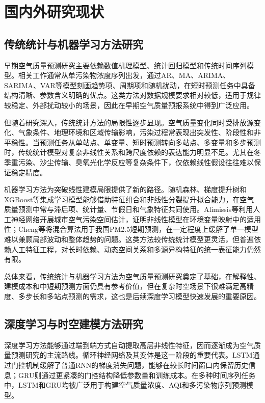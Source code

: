 \section{国内外研究现状}

\subsection{传统统计与机器学习方法研究}

早期空气质量预测研究主要依赖数值机理模型、统计回归模型和传统时间序列模型。相关工作通常从单污染物浓度序列出发，通过AR、MA、ARIMA、SARIMA、VAR等模型刻画趋势项、周期项和随机扰动，在短时预测任务中具备结构清晰、参数含义明确的优点\cite{baklanov_integrated_2007,peinado_statistical_2025}。这类方法对数据规模要求相对较低，适用于规律较稳定、外部扰动较小的场景，因此在早期空气质量预报系统中得到广泛应用。

但随着研究深入，传统统计方法的局限性逐步显现。空气质量变化同时受排放源变化、气象条件、地理环境和区域传输影响，污染过程常表现出突发性、阶段性和非平稳性。当预测任务从单站点、单变量、短时预测转向多站点、多变量和多步预测时，传统统计模型对复杂非线性关系和跨尺度依赖的表达能力明显不足\cite{agbehadji_systematic_2024,peinado_statistical_2025}。尤其在冬季重污染、沙尘传输、臭氧光化学反应等复杂条件下，仅依赖线性假设往往难以保证稳定精度。

机器学习方法为突破线性建模局限提供了新的路径。随机森林、梯度提升树和XGBoost等集成学习模型能够借助特征组合和非线性分裂提升拟合能力\cite{breiman_random_2001,chen_xgboost_2016}，在空气质量预测中常与滞后项、统计量、节假日和气象特征共同使用。Alimissis等利用人工神经网络开展城市空气污染空间估计，证明非线性模型在环境变量映射中的适用性\cite{alimissis_spatial_2018}；Cheng等将混合算法用于我国PM2.5短期预测，在一定程度上缓解了单一模型难以兼顾局部波动和整体趋势的问题\cite{cheng_hybrid_2019}。这类方法较传统统计模型更灵活，但普遍依赖人工特征工程，对长时依赖、动态空间关系和多源异构特征的统一表征能力仍然有限。

总体来看，传统统计与机器学习方法为空气质量预测研究奠定了基础，在解释性、建模成本和中短期预测方面仍具有参考价值，但在复杂时空场景下很难满足高精度、多步长和多站点预测的需求，这也是后续深度学习模型快速发展的重要原因。

\subsection{深度学习与时空建模方法研究}

深度学习方法能够通过端到端方式自动提取高层非线性特征，因而逐渐成为空气质量预测研究的主流路线。循环神经网络及其变体是这一阶段的重要代表。LSTM通过门控机制缓解了普通RNN的梯度消失问题，能够在较长时间窗口内保留历史信息\cite{hochreiter_long_1997}；GRU则通过更紧凑的门控结构降低参数量和训练成本\cite{cho_learning_2014}。在多种时间序列任务中，LSTM和GRU均被广泛用于构建空气质量浓度、AQI和多污染物序列预测模型。

